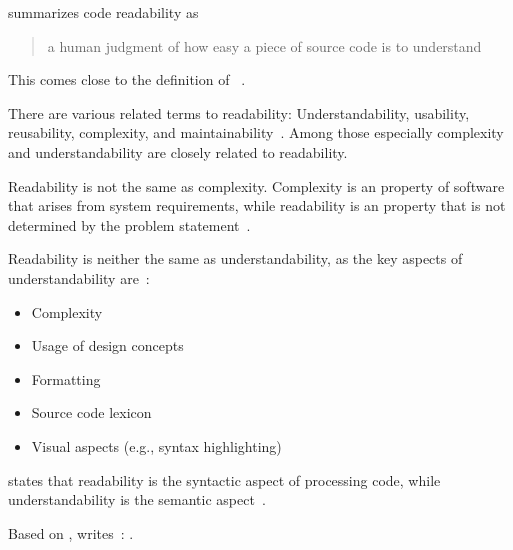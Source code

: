 \documentclass[%
class=scrreprt,
chapterprefix=false,%
open=right,%
twoside=false,%
paper=a4,%
logofile={Logo\_zentral\_farbig\_EN.png},%
thesistype=master,%
UKenglish,%
]{se2thesis}
\theoremstyle{definition}
\begin{document}
	\citeauthor{mi2021effectiveness} summarizes code readability as \blockcquote{mi2021effectiveness}{a human judgment of how easy a piece of source code is to understand}. This comes close to the definition of \citeauthor{buse2009learning}~\cite{buse2009learning}.
	
	There are various related terms to readability: Understandability, usability, reusability, complexity, and maintainability~\cite{tashtoush2013impact}. Among those especially complexity and understandability are closely related to readability.
	
	Readability is not the same as complexity. Complexity is an  property of software that arises
	from system requirements, while readability is an  property that is not determined by the problem statement~\cite{buse2009learning, brooks1987no}.
	
	Readability is neither the same as understandability, as the key aspects of understandability are~\cite{scalabrino2018comprehensive, martin2009clean, wilson2007beautiful, beck2007implementation}:
	\begin{itemize}
		\item Complexity
		\item Usage of design concepts
		\item Formatting
		\item Source code lexicon
		\item Visual aspects (e.g., syntax highlighting)
	\end{itemize}
	
	\citeauthor{posnett2011simpler} states that readability is the syntactic aspect of processing code, while understandability is the semantic aspect~\cite{posnett2011simpler}.
	
	Based on \citeauthor{posnett2011simpler}, \citeauthor{scalabrino2018comprehensive} writes~\cite{scalabrino2018comprehensive}:
	.
	
	
\end{document}
